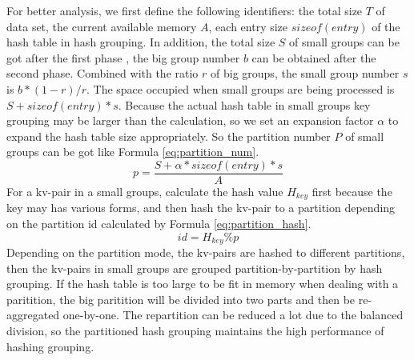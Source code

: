For better analysis, we first define the following identifiers: the total size $T$ of data set, the current available memory $A$, each entry size $sizeof(entry)$ of the hash table in hash grouping. In addition, the total size $S$ of small groups can be got after the first phase , the big group number $b$ can be obtained after the second phase. Combined with the ratio $r$ of big groups, the small group number $s$ is $b*(1-r)/r$. The space occupied when small groups are being processed is $S + sizeof(entry)*s$. Because the actual hash table in small groups key grouping may be larger than the calculation, so we set an expansion factor $\alpha$ to expand the hash table size appropriately. So the partition number $P$ of small groups can be got like Formula \ref{eq:partition_num}. 
\begin{equation}\label{eq:partition_num}
    p = \dfrac{S + \alpha*sizeof(entry)*s}{A}
\end{equation}
For a kv-pair in a small groups, calculate the hash value $H_{key}$ first because the key may has various forms, and then hash the kv-pair to a partition depending on the partition id calculated by Formula \ref{eq:partition_hash}.
\begin{equation}\label{eq:partition_hash}
    id = H_{key} \%  p
\end{equation}  
Depending on the partition mode, the kv-pairs are hashed to different partitions, then the kv-pairs in small groups are grouped partition-by-partition by hash grouping. If the hash table is too large to be fit in memory when dealing with a paritition, the big paritition will be divided into two parts and then be re-aggregated one-by-one. The repartition can be reduced a lot due to the balanced division, so the partitioned hash grouping maintains the high performance of hashing grouping. 

